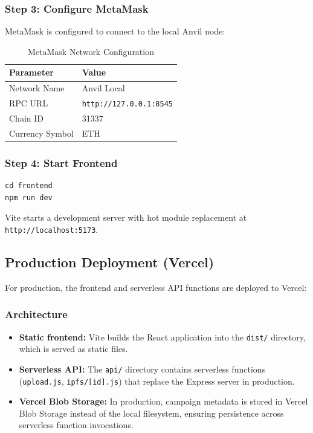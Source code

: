 \subsubsection{Step 3: Configure MetaMask}

MetaMask is configured to connect to the local Anvil node:

\begin{table}[H]
\centering
\caption{MetaMask Network Configuration}
\begin{tabular}{l l}
\toprule
\textbf{Parameter} & \textbf{Value} \\
\midrule
Network Name    & Anvil Local \\
RPC URL         & \texttt{http://127.0.0.1:8545} \\
Chain ID        & 31337 \\
Currency Symbol & ETH \\
\bottomrule
\end{tabular}
\end{table}

\subsubsection{Step 4: Start Frontend}

\begin{lstlisting}[language={}, caption={Frontend Development Server}]
cd frontend
npm run dev
\end{lstlisting}

Vite starts a development server with hot module replacement at \texttt{http://localhost:5173}.

\subsection{Production Deployment (Vercel)}

For production, the frontend and serverless API functions are deployed to Vercel:

\subsubsection{Architecture}

\begin{itemize}[leftmargin=1.5em]
    \item \textbf{Static frontend:} Vite builds the React application into the \texttt{dist/} directory, which is served as static files.
    \item \textbf{Serverless API:} The \texttt{api/} directory contains serverless functions (\texttt{upload.js}, \texttt{ipfs/[id].js}) that replace the Express server in production.
    \item \textbf{Vercel Blob Storage:} In production, campaign metadata is stored in Vercel Blob Storage instead of the local filesystem, ensuring persistence across serverless function invocations.
\end{itemize}

